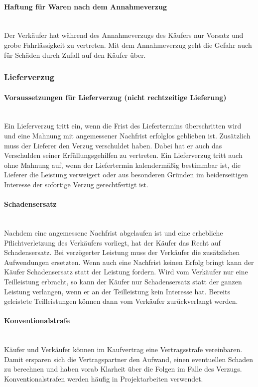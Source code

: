 \paragraph{Haftung für Waren nach dem Annahmeverzug}~\\
Der Verkäufer hat während des Annahmeverzugs des Käufers nur Vorsatz und grobe Fahrlässigkeit zu vertreten. Mit dem Annahmeverzug geht die Gefahr auch für Schäden durch Zufall auf den Käufer über.
	
\subsubsection{Lieferverzug}

\paragraph{Voraussetzungen für Lieferverzug (nicht rechtzeitige Lieferung)}~\\
Ein Lieferverzug tritt ein, wenn die Frist des Liefertermins überschritten wird und eine Mahnung mit angemessener Nachfrist erfolglos geblieben ist. Zusätzlich muss der Lieferer den Verzug verschuldet haben. Dabei hat er auch das Verschulden seiner Erfüllungsgehilfen zu vertreten. Ein Lieferverzug tritt auch ohne Mahnung auf, wenn der Liefertermin kalendermäßig bestimmbar ist, die Lieferer die Leistung verweigert oder aus besonderen Gründen im beiderseitigen Interesse der sofortige Verzug gerechtfertigt ist.

\paragraph{Schadensersatz}~\\
Nachdem eine angemessene Nachfrist abgelaufen ist und eine erhebliche Pflichtverletzung des Verkäufers vorliegt, hat der Käufer das Recht auf Schadensersatz. Bei verzögerter Leistung muss der Verkäufer die zusätzlichen Aufwendungen ersetzten. Wenn auch eine Nachfrist keinen Erfolg bringt kann der Käufer Schadensersatz statt der Leistung fordern. Wird vom Verkäufer nur eine Teilleistung erbracht, so kann der Käufer nur Schadensersatz statt der ganzen Leistung verlangen, wenn er an der Teilleistung kein Interesse hat. Bereits geleistete Teilleistungen können dann vom Verkäufer zurückverlangt werden.

\paragraph{Konventionalstrafe}~\\
Käufer und Verkäufer können im Kaufvertrag eine Vertragsstrafe vereinbaren. Damit ersparen sich die Vertragspartner den Aufwand, einen eventuellen Schaden zu berechnen und haben vorab Klarheit über die Folgen im Falle des Verzugs. Konventionalstrafen werden häufig in Projektarbeiten verwendet.

